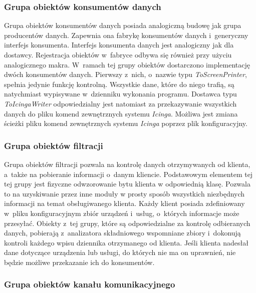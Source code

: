 \subsubsection[Grupa obiektów konsumentów danych][Grupa obiektów
konsumentów danych]{Grupa obiektów konsumentów danych}

Grupa obiektów konsumentów danych posiada analogiczną budowę jak grupa
producentów danych. Zapewnia ona fabrykę konsumentów danych
i~generyczny interfejs konsumenta. Interfejs konsumenta danych jest
analogiczny jak dla dostawcy. Rejestracja obiektów w~fabryce odbywa
się również przy użyciu analogicznego makra. W~ramach tej grupy
obiektów dostarczono implementację dwóch konsumentów danych. Pierwszy
z~nich, o~nazwie typu {\em ToScreenPrinter}, spełnia jedynie funkcję
kontrolną. Wszystkie dane, które do niego trafią, są natychmiast
wypisywane w~dzienniku wykonania programu. Dostawca typu {\em
  ToIcingaWriter} odpowiedzialny jest natomiast za przekazywanie
wszystkich danych do pliku komend zewnętrznych systemu {\em Icinga}. Możliwa
jest zmiana ścieżki pliku komend zewnętrznych systemu {\em Icinga} poprzez
plik konfiguracyjny.

\subsubsection[Grupa obiektów filtracji][Grupa obiektów
filtracji]{Grupa obiektów filtracji}

Grupa obiektów filtracji pozwala na kontrolę danych otrzymywanych od
klienta, a~także na pobieranie informacji o~danym
kliencie. Podstawowym elementem tej tej grupy jest fizyczne
odwzorowanie bytu klienta w odpowiednią klasę. Pozwala to na
uzyskiwanie przez inne moduły w prosty sposób wszystkich niezbędnych
informacji na temat obsługiwanego klienta. Każdy klient posiada
zdefiniowany w~pliku konfiguracyjnym zbiór urządzeń i~usług, o~których
informacje może przesyłać. Obiekty z~tej grupy, które są
odpowiedzialne za kontrolę odbieranych danych, pobierają z~analizatora
składniowego wspomniane zbiory i~dokonują kontroli każdego wpisu
dziennika otrzymanego od klienta. Jeśli klienta nadesłał dane
dotyczące urządzenia lub usługi, do których nie ma on uprawnień, nie
będzie możliwe przekazanie ich do konsumentów.

\subsubsection[Grupa obiektów kanału komunikacyjnego][Grupa obiektów
kanału komunikacyjnego]{Grupa obiektów kanału komunikacyjnego}

